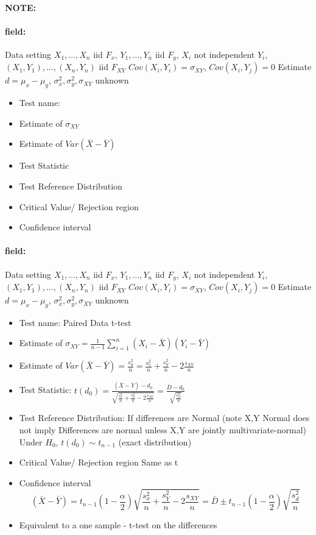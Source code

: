 \documentclass[12pt]{article}
\newenvironment{note}{\paragraph{NOTE:}}{}
\newenvironment{field}{\paragraph{field:}}{}
\begin{document}
\begin{note}
 \begin{field}
  Data setting $X_1, \ldots , X_n$ iid $F_x$, $Y_1, \ldots, Y_n$ iid $F_y$, $X_i$ not independent $Y_i$, $(X_1, Y_1), \ldots , (X_n,Y_n)$ iid $F_{XY}$ $Cov(X_i,Y_i) = \sigma_{XY}$, $Cov(X_i,Y_j) = 0$ Estimate $d = \mu_x - \mu_y$, $\sigma_x^2, \sigma_y^2, \sigma_{XY}$ unknown
  \begin{itemize}
   \item Test name:
   \item Estimate of $\sigma_{XY}$
   \item Estimate of $Var(\bar{X} - \bar{Y})$
   \item Test Statistic
   \item Test Reference Distribution
   \item Critical Value/ Rejection region
   \item Confidence interval
  \end{itemize}
 \end{field}
 \begin{field}
  Data setting $X_1, \ldots , X_n$ iid $F_x$, $Y_1, \ldots, Y_n$ iid $F_y$, $X_i$ not independent $Y_i$, $(X_1, Y_1), \ldots , (X_n,Y_n)$ iid $F_{XY}$ $Cov(X_i,Y_i) = \sigma_{XY}$, $Cov(X_i,Y_j) = 0$ Estimate $d = \mu_x - \mu_y$, $\sigma_x^2, \sigma_y^2, \sigma_{XY}$ unknown
  \begin{itemize}
   \item Test name: Paired Data t-test
   \item Estimate of $\sigma_{XY} = \frac{1}{n-1} \sum_{i=1}^n (X_i - \bar{X})(Y_i - \bar{Y})$
   \item Estimate of $Var(\bar{X} - \bar{Y}) = \frac{s_d^2}{n} = \frac{s_x^2}{n} + \frac{s_Y^2}{n} - 2 \frac{s_{XY}}{n}$
   \item Test Statistic: $t(d_0) = \frac{(\bar{X} - \bar{Y}) - d_0}{\sqrt{\frac{s_x^2}{n} + \frac{s_Y^2}{n} - 2 \frac{s_{XY}}{n}}} = \frac{\bar{D} - d_0}{\sqrt{\frac{s_D^2}{n}}}$
   \item Test Reference Distribution: If differences are Normal (note X,Y Normal does not imply Differences are normal unless X,Y are jointly multivariate-normal) Under $H_0$, $t(d_0) \sim t_{n-1}$ (exact distribution)
   \item Critical Value/ Rejection region Same as t
   \item Confidence interval
         $$ (\bar{X} - \bar{Y}) = t_{n-1}(1 - \frac{\alpha}{2})\sqrt{\frac{s_x^2}{n} + \frac{s_Y^2}{n} - 2 \frac{s_{XY}}{n}} = \bar{D} \pm  t_{n-1}(1 - \frac{\alpha}{2}) \sqrt{\frac{s_d^2}{n}}$$
   \item Equivalent to a one sample - t-test on the differences
  \end{itemize}
 \end{field}
\end{note}
\end{document}
